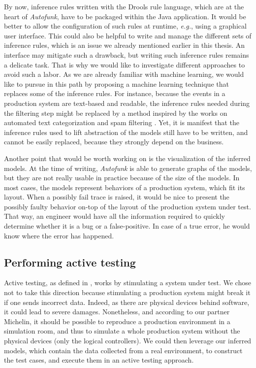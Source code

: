 By now, inference rules written with the Drools rule language,
which are at the heart of \emph{Autofunk}, have to be packaged
within the Java application. It would be better to allow the
configuration of such rules at runtime, \emph{e.g.}, using a
graphical user interface. This could also be helpful to write and
manage the different sets of inference rules, which is an issue
we already mentioned earlier in this thesis. An interface may
mitigate such a drawback, but writing such inference rules
remains a delicate task. That is why we would like to investigate
different approaches to avoid such a labor. As we are already
familiar with machine learning, we would like to pursue in this
path by proposing a machine learning technique that replaces some
of the inference rules. For instance, because the events in a
production system are text-based and readable, the inference
rules needed during the filtering step might be replaced by a
method inspired by the works on automated text categorization
\cite{Sebastiani:2002:MLA:505282.505283} and spam filtering
\cite{Guzella200910206}. Yet, it is manifest that the inference
rules used to lift abstraction of the models still have to be
written, and cannot be easily replaced, because they strongly
depend on the business.

Another point that would be worth working on is the visualization
of the inferred models. At the time of writing, \emph{Autofunk}
is able to generate graphs of the models, but they are not really
usable in practice because of the size of the models. In most
cases, the models represent behaviors of a production system,
which fit its layout. When a possibly fail trace is raised, it
would be nice to present the possibly faulty behavior on-top of
the layout of the production system under test. That way, an
engineer would have all the information required to quickly
determine whether it is a bug or a false-positive. In case of a
true error, he would know where the error has happened.


\subsection{Performing active testing}
\label{sec:conclusion:testing:active}

Active testing, as defined in
,
works by stimulating a system under test. We chose not to take
this direction because stimulating a production system might
break it if one sends incorrect data. Indeed, as there are
physical devices behind software, it could lead to severe
damages.  Nonetheless, and according to our partner Michelin, it
should be possible to reproduce a production environment in a
simulation room, and thus to simulate a whole production system
without the physical devices (only the logical controllers). We
could then leverage our inferred models, which contain the data
collected from a real environment, to construct the test cases,
and execute them in an active testing approach.

